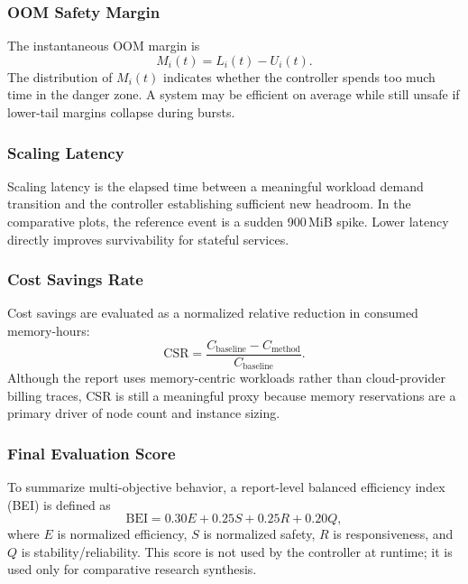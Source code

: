 \documentclass[12pt,a4paper]{article}
\begin{document}
\subsubsection{OOM Safety Margin}

The instantaneous OOM margin is
\begin{equation}
\label{eq:margin}
M_i(t)=L_i(t)-U_i(t).
\end{equation}
The distribution of $M_i(t)$ indicates whether the controller spends too much time in the danger zone. A system may be efficient on average while still unsafe if lower-tail margins collapse during bursts.

\subsubsection{Scaling Latency}

Scaling latency is the elapsed time between a meaningful workload demand transition and the controller establishing sufficient new headroom. In the comparative plots, the reference event is a sudden 900\,MiB spike. Lower latency directly improves survivability for stateful services.

\subsubsection{Cost Savings Rate}

Cost savings are evaluated as a normalized relative reduction in consumed memory-hours:
\begin{equation}
\label{eq:cost}
\text{CSR} = \frac{C_{\text{baseline}} - C_{\text{method}}}{C_{\text{baseline}}}.
\end{equation}
Although the report uses memory-centric workloads rather than cloud-provider billing traces, CSR is still a meaningful proxy because memory reservations are a primary driver of node count and instance sizing.

\subsubsection{Final Evaluation Score}

To summarize multi-objective behavior, a report-level balanced efficiency index (BEI) is defined as
\begin{equation}
\label{eq:bei}
\text{BEI} = 0.30E + 0.25S + 0.25R + 0.20Q,
\end{equation}
where $E$ is normalized efficiency, $S$ is normalized safety, $R$ is responsiveness, and $Q$ is stability/reliability. This score is not used by the controller at runtime; it is used only for comparative research synthesis.
\end{document}
